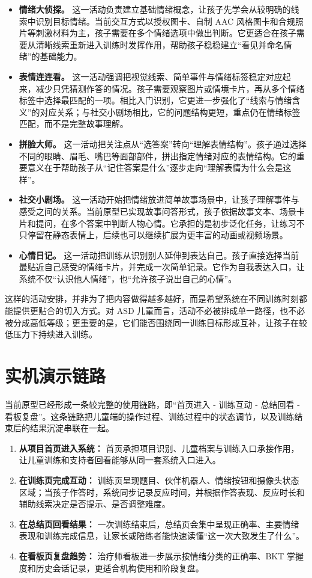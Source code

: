 \begin{itemize}
  \item \textbf{情绪大侦探。} 这一活动负责建立基础情绪概念，让孩子先学会从较明确的线索中识别目标情绪。当前交互方式以授权图卡、自制 AAC 风格图卡和合规照片等刺激材料为主，孩子需要在多个情绪选项中做出判断。它更适合在孩子需要从清晰线索重新进入训练时发挥作用，帮助孩子稳稳建立“看见并命名情绪”的基础能力。
  \item \textbf{表情连连看。} 这一活动强调把视觉线索、简单事件与情绪标签稳定对应起来，减少只凭猜测作答的情况。孩子需要观察图片或情境卡片，再从多个情绪标签中选择最匹配的一项。相比入门识别，它更进一步强化了“线索与情绪含义”的对应关系；与社交小剧场相比，它的问题结构更短，重点仍在情绪标签匹配，而不是完整故事理解。
  \item \textbf{拼脸大师。} 这一活动把关注点从“选答案”转向“理解表情结构”。孩子通过选择不同的眼睛、眉毛、嘴巴等面部部件，拼出指定情绪对应的表情结构。它的重要意义在于帮助孩子从“记住答案是什么”逐步走向“理解表情为什么会是这样”。
  \item \textbf{社交小剧场。} 这一活动开始把情绪放进简单故事场景中，让孩子理解事件与感受之间的关系。当前原型已实现故事问答形式，孩子依据故事文本、场景卡片和提问，在多个答案中判断人物心情。它承担的是初步泛化任务，让练习不只停留在静态表情上，后续也可以继续扩展为更丰富的动画或视频场景。
  \item \textbf{心情日记。} 这一活动把训练从识别别人延伸到表达自己。孩子直接选择当前最贴近自己感受的情绪卡片，并完成一次简单记录。它作为自我表达入口，让系统不仅“认识他人情绪”，也“允许孩子说出自己的心情”。
\end{itemize}

这样的活动安排，并非为了把内容做得越多越好，而是希望系统在不同训练时刻都能提供更贴合的切入方式。对 ASD 儿童而言，活动不必被排成单一路径，也不必被分成高低等级；更重要的是，它们能否围绕同一训练目标形成互补，让孩子在较低压力下持续进入训练。


\section{实机演示链路}
当前原型已经形成一条较完整的使用链路，即“首页进入 - 训练互动 - 总结回看 - 看板复盘”。这条链路把儿童端的操作过程、训练过程中的状态调节，以及训练结束后的结果沉淀串联在一起。

\begin{enumerate}
  \item \textbf{从项目首页进入系统：} 首页承担项目识别、儿童档案与训练入口承接作用，让儿童训练和支持者回看能够从同一套系统入口进入。
  \item \textbf{在训练页完成互动：} 训练页呈现题目、伙伴机器人、情绪按钮和摄像头状态区域；当孩子作答时，系统同步记录反应时间，并根据作答表现、反应时长和辅助线索决定是否提示、是否调整难度。
  \item \textbf{在总结页回看结果：} 一次训练结束后，总结页会集中呈现正确率、主要情绪表现和训练完成信息，让家长或陪练者能快速读懂“这一次大致发生了什么”。
  \item \textbf{在看板页复盘趋势：} 治疗师看板进一步展示按情绪分类的正确率、BKT 掌握度和历史会话记录，更适合机构使用和阶段复盘。
\end{enumerate}

